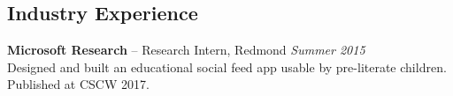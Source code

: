 \documentclass[margin,line]{resume}
\begin{document}
\begin{resume}


\section{\mysidestyle Industry Experience}

\textbf{Microsoft Research} -- Research Intern, Redmond \hfill \textsl{Summer 2015}\\
Designed and built an educational social feed app usable by pre-literate children. Published at CSCW 2017.\\


\end{resume}
\end{document}
